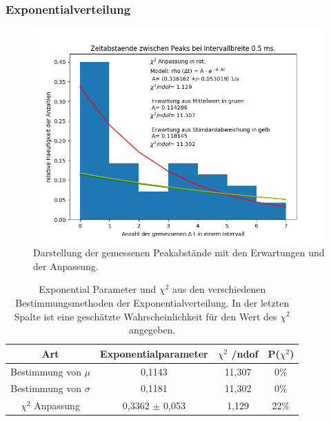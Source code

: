 \documentclass[12pt,a4paper]{article}
\begin{document}
\subsubsection{Exponentialverteilung}
\begin{figure}
\centering
\includegraphics[scale=0.8]{Bilder/Peakabstaende.PNG}
\caption{Darstellung der gemessenen Peakabstände mit den Erwartungen und der Anpassung.}
\label{fig:exponential}
\end{figure}

\begin{table}
\centering
\begin{tabular}{|c|c|c|c|}
\hline 
Art & Exponentialparameter & $\chi ^2$ /ndof & P($\chi ^2$) \\ 
\hline 
Bestimmung von $\mu$ & 0,1143 & 11,307 & 0\% \\ 
\hline 
Bestimmung von $\sigma$ & 0,1181 & 11,302 & 0\% \\ 
\hline 
$\chi ^2$ Anpassung & 0,3362 $\pm$ 0,053 & 1,129 & 22\% \\ 
\hline 
\end{tabular} 
\caption{Exponential Parameter und $\chi ^2$ aus den verschiedenen Bestimmungsmethoden der Exponentialverteilung. In der letzten Spalte ist eine geschätzte Wahrscheinlichkeit für den Wert des $\chi ^2$ angegeben.}
\label{tab:Exponential}
\end{table}
\end{document}
